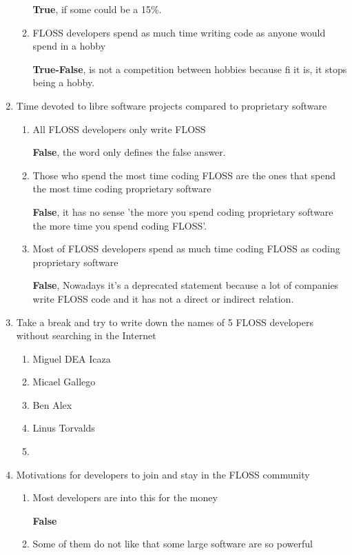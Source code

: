 \documentclass[11pt]{scrartcl}
\begin{document}
\begin{enumerate}
\begin{enumerate}
		\textbf{True}, if some could be a 15\%.
		\item FLOSS developers spend as much time writing code as anyone would spend in a hobby
		
		\textbf{True-False}, is not a competition between hobbies because fi it is, it stops being a hobby.
	\end{enumerate}

	\item Time devoted to libre software projects compared to proprietary software
	\begin{enumerate}
		\item All FLOSS developers only write FLOSS
		
		\textbf{False}, the word only defines the false answer.
		\item Those who spend the most time coding FLOSS are the ones that spend the most time coding proprietary software
		
		\textbf{False}, it has no sense 'the more you spend coding proprietary software the more time you spend coding FLOSS'.
		\item Most of FLOSS developers spend as much time coding FLOSS as coding proprietary software
		
		\textbf{False}, Nowadays it's a deprecated statement because a lot of companies write FLOSS code and it has not a direct or indirect relation.
	\end{enumerate}

	\item Take a break and try to write down the names of 5 FLOSS developers without
	searching in the Internet
	\begin{enumerate}
		\item Miguel DEA Icaza
		\item Micael Gallego
		\item Ben Alex
		\item Linus Torvalds
		\item 
	\end{enumerate}
	
	\item Motivations for developers to join and stay in the FLOSS community
	\begin{enumerate}
		\item Most developers are into this for the money
		
		\textbf{False}
		\item Some of them do not like that some large software are so powerful
		

\end{enumerate}
\end{enumerate}
\end{document}
